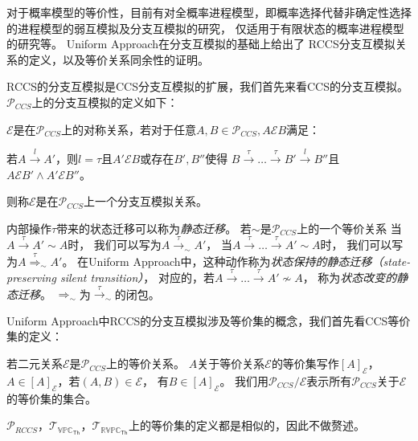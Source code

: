    对于概率模型的等价性，目前有对全概率进程模型，即概率选择代替非确定性选择的进程模型的弱互模拟及分支互模拟的研究\cite{全概率的弱互模拟和分支互模拟}，
   仅适用于有限状态的概率进程模型的研究\cite{有限状态_1,有限状态_2}等。
   Uniform Approach在分支互模拟\cite{Branching_1, Branching_2}的基础上给出了
   RCCS分支互模拟关系的定义，以及等价关系同余性的证明。
   
   RCCS的分支互模拟是CCS分支互模拟的扩展，我们首先来看CCS的分支互模拟。
   $\mathcal{P}_{CCS}$上的分支互模拟的定义如下：
   \begin{definition}\label{def:branching0}
      $\mathcal{E}$是在$\mathcal{P}_{CCS}$上的对称关系，若对于任意$A,B\in \mathcal{P}_{CCS},A\mathcal{E}B$满足：

            若$A\stackrel{l}{\rightarrow}A'$，则$l=\tau$且$A'\mathcal{E}B$或存在$B',B''$使得
            $B\stackrel{\tau}{\rightarrow}\dots\stackrel{\tau}{\rightarrow}B'\stackrel{l}{\rightarrow}B''$且$A\mathcal{E}B'\wedge A'\mathcal{E}B''$。

            则称$\mathcal{E}$是在$\mathcal{P}_{CCS}$上一个分支互模拟关系。
   \end{definition}
   
   内部操作$\tau$带来的状态迁移可以称为\textit{静态迁移}。
   若$\sim$是$\mathcal{P}_{CCS}$上的一个等价关系
   当$A\stackrel{\tau}{\rightarrow}A'\sim A$时，
   我们可以写为$A\stackrel{\tau}{\rightarrow}_{\sim}A'$，
   当$A\stackrel{\tau}{\rightarrow}\dots \stackrel{\tau}{\rightarrow}A'\sim A$时，
   我们可以写为$A\stackrel{\tau}{\Rightarrow}_{\sim}A'$。
   在Uniform Approach中，这种动作称为\textit{状态保持的静态迁移（state-preserving silent transition）}，
   对应的，若$A\stackrel{\tau}{\rightarrow}\dots \stackrel{\tau}{\rightarrow}A'\not\sim A$，
   称为\textit{状态改变的静态迁移}。
   $\Rightarrow_{\sim}$为$\stackrel{\tau}{\rightarrow}_{\sim}$的闭包。

   Uniform Approach中RCCS的分支互模拟涉及等价集的概念，我们首先看CCS等价集的定义：
   \begin{definition}
      若二元关系$\mathcal{E}$是$\mathcal{P}_{CCS}$上的等价关系。
      $A$关于等价关系$\mathcal{E}$的等价集写作$[A]_{\mathcal{E}}$，
      $A\in [A]_{\mathcal{E}}$，若$(A,B)\in \mathcal{E}$，
      有$B\in [A]_{\mathcal{E}}$。
      我们用$\mathcal{P}_{CCS}/\mathcal{E}$表示所有$\mathcal{P}_{CCS}$关于$\mathcal{E}$的等价集的集合。
   \end{definition}
   $\mathcal{P}_{RCCS}$，$\mathcal{T}_{\mathbb{VPC}_{\mathsf{Th}}}$，$\mathcal{T}_{\mathbb{RVPC}_{\mathsf{Th}}}$上的等价集的定义都是相似的，因此不做赘述。

